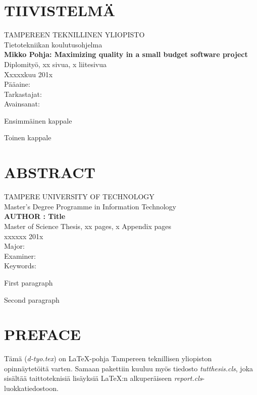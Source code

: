\documentclass[12pt,a4paper,finnish]{tutthesis}
\begin{document}
\newpage
 
\setcounter{page}{1} %
 
\chapter*{TIIVISTELMÄ}
\begin{spacing}{1.0}
\textsf{TAMPEREEN TEKNILLINEN YLIOPISTO}\\
\textsf{Tietotekniikan koulutusohjelma}\\
{\bf \textsf{Mikko Pohja: Maximizing quality in a small budget software project}}\\
\textsf{Diplomityö, xx sivua, x liitesivua}\\
\textsf{Xxxxxkuu 201x}\\
\textsf{Pääaine: }\\
\textsf{Tarkastajat: }\\
\textsf{Avainsanat: }\\
\end{spacing}
 
\noindent
Ensimmäinen kappale
 
\noindent
Toinen kappale
\newpage
\chapter*{ABSTRACT}
\begin{spacing}{1.0}
\textsf{TAMPERE UNIVERSITY OF TECHNOLOGY}\\
\textsf{Master's Degree Programme in Information Technology}\\
{\bf \textsf{AUTHOR : Title}}\\
\textsf{Master of Science Thesis, xx pages, x Appendix pages}\\
\textsf{xxxxxx 201x}\\
\textsf{Major: }\\
\textsf{Examiner: }\\
\textsf{Keywords: }\\
\end{spacing}
 
\noindent 
First paragraph
 
\noindent
Second paragraph
 
\newpage
 
\chapter*{PREFACE}
\noindent Tämä (\textit{d-tyo.tex}) on \LaTeX-pohja Tampereen teknillisen
yliopiston opinnäytetöitä varten. Samaan pakettiin kuuluu myös
tiedosto \mbox{\textit{tutthesis.cls}}, joka sisältää taittoteknisiä
lisäyksiä \LaTeX:n alkuperäiseen \textit{report.cls}-luokkatiedostoon.
 
\end{document}
